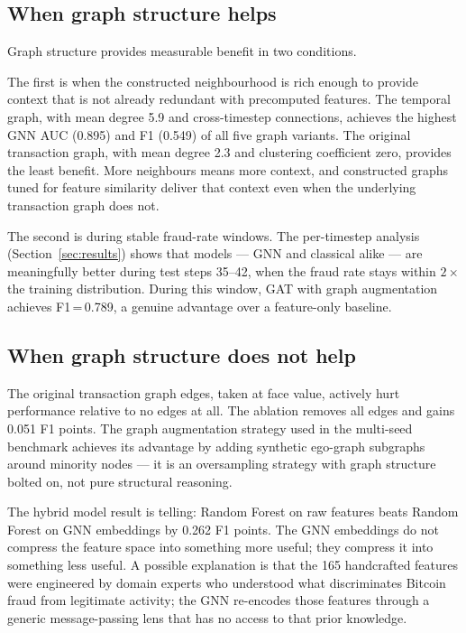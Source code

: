 \subsection{When graph structure helps}

Graph structure provides measurable benefit in two conditions.

The first is when the constructed neighbourhood is rich enough to provide
context that is not already redundant with precomputed features. The temporal
graph, with mean degree 5.9 and cross-timestep connections, achieves the
highest GNN AUC (0.895) and F1 (0.549) of all five graph variants. The
original transaction graph, with mean degree 2.3 and clustering coefficient
zero, provides the least benefit. More neighbours means more context,
and constructed graphs tuned for feature similarity deliver that context
even when the underlying transaction graph does not.

The second is during stable fraud-rate windows. The per-timestep analysis
(Section~\ref{sec:results}) shows that models — GNN and classical alike —
are meaningfully better during test steps 35--42, when the fraud rate
stays within $2\times$ the training distribution. During this window,
GAT with graph augmentation achieves F1\,=\,0.789, a genuine advantage
over a feature-only baseline.

\subsection{When graph structure does not help}

The original transaction graph edges, taken at face value, actively hurt
performance relative to no edges at all. The ablation removes all edges
and gains 0.051 F1 points. The graph augmentation strategy used in the
multi-seed benchmark achieves its advantage by adding synthetic ego-graph
subgraphs around minority nodes — it is an oversampling strategy with
graph structure bolted on, not pure structural reasoning.

The hybrid model result is telling: Random Forest on raw features beats
Random Forest on GNN embeddings by 0.262 F1 points. The GNN embeddings
do not compress the feature space into something more useful; they compress
it into something less useful. A possible explanation is that the 165
handcrafted features were engineered by domain experts who understood what
discriminates Bitcoin fraud from legitimate activity; the GNN re-encodes
those features through a generic message-passing lens that has no access to
that prior knowledge.

